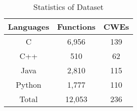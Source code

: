 \begin{table}[!t]
  \centering
  \caption{Statistics of Dataset}
    \label{tab:dataset}%
    \begin{tabular}{ccc}
    \toprule
    Languages & Functions & CWEs \\
    \midrule
    C     & 6,956  & 139 \\
    C++   & 510   & 62 \\
    Java  & 2,810  & 115 \\
    Python & 1,777  & 110 \\
    \midrule
    Total & 12,053 & 236 \\
    \bottomrule
    \end{tabular}%

\end{table}%

